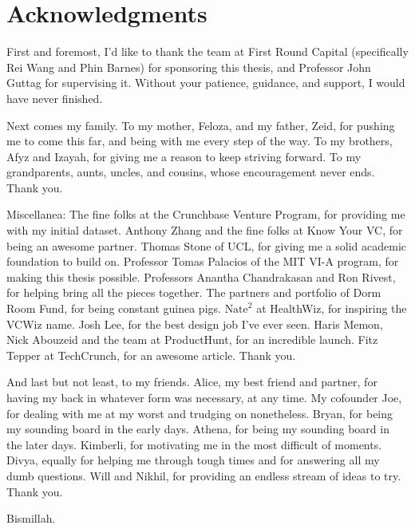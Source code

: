 % 

\cleardoublepage

\section*{Acknowledgments}

First and foremost, I'd like to thank the team at First Round Capital (specifically Rei Wang and Phin Barnes) for sponsoring this thesis, and Professor John Guttag for supervising it. Without your patience, guidance, and support, I would have never finished.

Next comes my family. To my mother, Feloza, and my father, Zeid, for pushing me to come this far, and being with me every step of the way. To my brothers, Afyz and Izayah, for giving me a reason to keep striving forward. To my grandparents, aunts, uncles, and cousins, whose encouragement never ends. Thank you.

Miscellanea: The fine folks at the Crunchbase Venture Program, for providing me with my initial dataset. Anthony Zhang and the fine folks at Know Your VC, for being an awesome partner. Thomas Stone of UCL, for giving me a solid academic foundation to build on. Professor Tomas Palacios of the MIT VI-A program, for making this thesis possible. Professors Anantha Chandrakasan and Ron Rivest, for helping bring all the pieces together. The partners and portfolio of Dorm Room Fund, for being constant guinea pigs. $\text{Nate}^2$ at HealthWiz, for inspiring the VCWiz name. Josh Lee, for the best design job I've ever seen. Haris Memon, Nick Abouzeid and the team at ProductHunt, for an incredible launch. Fitz Tepper at TechCrunch, for an awesome article. Thank you.

And last but not least, to my friends. Alice, my best friend and partner, for having my back in whatever form was necessary, at any time. My cofounder Joe, for dealing with me at my worst and trudging on nonetheless. Bryan, for being my sounding board in the early days. Athena, for being my sounding board in the later days. Kimberli, for motivating me in the most difficult of moments. Divya, equally for helping me through tough times and for answering all my dumb questions. Will and Nikhil, for providing an endless stream of ideas to try. Thank you.

Bismillah.

